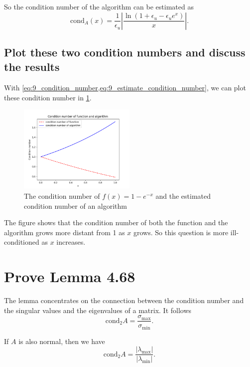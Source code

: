 \documentclass[a4paper]{article}
\begin{document}
So the condition number of the algorithm can be estimated as
\begin{equation}
    \text{cond}_A(x) = \frac{1}{\epsilon_u} \left|\frac{\ln(1 + \epsilon_u - \epsilon_u e^x)}{x}\right|.
    \label{eq:9_estimate_condition_number}
\end{equation}

\subsection{Plot these two condition numbers and discuss the results}

With \cref{eq:9_condition_number,eq:9_estimate_condition_number}, we can plot these condition number in \cref{fig:9_draw}.
\begin{figure}[htbp]
    \centering
    \includegraphics[width=0.5\textwidth]{../images/9_draw.png}
    \caption{The condition number of $f(x) = 1 - e^{-x}$ and the estimated condition number of an algorithm}
    \label{fig:9_draw}
\end{figure}

The figure shows that the condition number of both the function and the algorithm grows more distant from 1 as $x$ grows. So this question is more ill-conditioned as $x$ increases.

\section{Prove Lemma 4.68}

The lemma concentrates on the connection between the condition number and the singular values and the eigenvalues of a matrix. It follows
\begin{equation}
    \text{cond}_2 A = \frac{\sigma_{\text{max}}}{\sigma_\text{min}}.
    \label{eq:10_cond_A_singular}
\end{equation}

If $A$ is also normal, then we have 
\begin{equation}
    \text{cond}_2 A = \frac{|\lambda_{\text{max}}|}{|\lambda_{\text{min}}|}.
    \label{eq:10_cond_A_eigen}
\end{equation}
\end{document}
